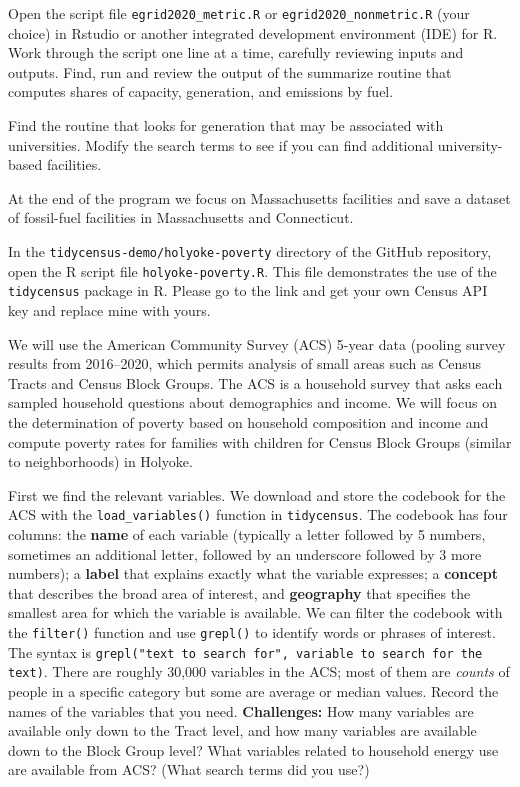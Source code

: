 \documentclass[fleqn, 12pt]{exam}
\begin{document}
\begin{questions}
  \question  Open the script file \texttt{egrid2020\_metric.R} or \texttt{egrid2020\_nonmetric.R} (your choice) in Rstudio or another integrated development environment (IDE) for R.  Work through the script one line at a time, carefully reviewing inputs and outputs.   Find, run and review the output of the summarize routine that computes shares of capacity, generation, and emissions by fuel. 

  \question Find the routine that looks for generation that may be associated with universities. Modify the search terms to see if you can find additional university-based facilities.
    
  \question At the end of the program we focus on Massachusetts facilities and save a dataset of fossil-fuel facilities in Massachusetts and Connecticut.
    
  \question In the \texttt{tidycensus-demo/holyoke-poverty} directory of the GitHub repository, open the R script file \texttt{holyoke-poverty.R}.  This file demonstrates the use of the \texttt{tidycensus} package in R.  Please go to the link and get your own Census API key and replace mine with yours.

  \question We will use the American Community Survey (ACS) 5-year data (pooling survey results from 2016--2020, which permits analysis of small areas such as Census Tracts and Census Block Groups.  The ACS is a household survey that asks each sampled household questions about demographics and income.  We will focus on the determination of poverty based on household composition and income and compute poverty rates for families with children for Census Block Groups (similar to neighborhoods) in Holyoke.

  \question First we find the relevant variables.  We download and store the codebook for the ACS with the \texttt{load\_variables()} function in \texttt{tidycensus}. The codebook has four columns: the \textbf{name} of each variable (typically a letter followed by 5 numbers, sometimes an additional letter, followed by an underscore followed by 3 more numbers); a \textbf{label} that explains exactly what the variable expresses; a \textbf{concept} that describes the broad area of interest, and \textbf{geography} that specifies the smallest area for which the variable is available.
    We can filter the codebook with the \texttt{filter()} function and use \texttt{grepl()} to identify words or phrases of interest. The syntax is \texttt{grepl("text to search for", variable to search for the text)}.  There are roughly 30,000 variables in the ACS; most of them are \emph{counts} of people in a specific category but some are average or median values. Record the names of the variables that you need. \textbf{Challenges:} How many variables are available only down to the Tract level, and how many variables are available down to the Block Group level? What variables related to household energy use are available from ACS? (What search terms did you use?)


\end{questions}
\end{document}
